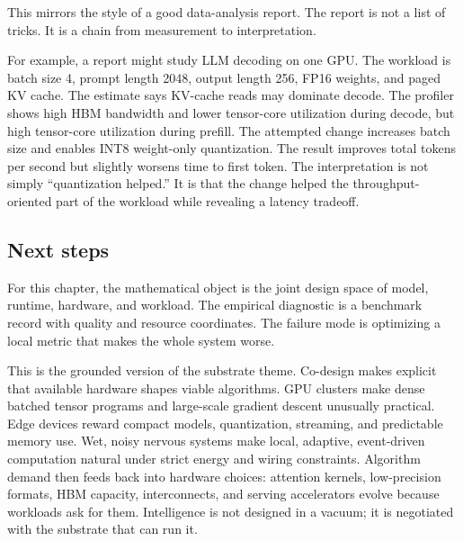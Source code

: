 This mirrors the style of a good data-analysis report. The report is not a list of tricks. It is a chain from measurement to interpretation.

For example, a report might study LLM decoding on one GPU. The workload is batch size 4, prompt length 2048, output length 256, FP16 weights, and paged KV cache. The estimate says KV-cache reads may dominate decode. The profiler shows high HBM bandwidth and lower tensor-core utilization during decode, but high tensor-core utilization during prefill. The attempted change increases batch size and enables INT8 weight-only quantization. The result improves total tokens per second but slightly worsens time to first token. The interpretation is not simply ``quantization helped.'' It is that the change helped the throughput-oriented part of the workload while revealing a latency tradeoff.

\subsection{Next steps}

For this chapter, the mathematical object is the joint design space of model, runtime, hardware, and workload. The empirical diagnostic is a benchmark record with quality and resource coordinates. The failure mode is optimizing a local metric that makes the whole system worse.

This is the grounded version of the substrate theme. Co-design makes explicit that available hardware shapes viable algorithms. GPU clusters make dense batched tensor programs and large-scale gradient descent unusually practical. Edge devices reward compact models, quantization, streaming, and predictable memory use. Wet, noisy nervous systems make local, adaptive, event-driven computation natural under strict energy and wiring constraints. Algorithm demand then feeds back into hardware choices: attention kernels, low-precision formats, HBM capacity, interconnects, and serving accelerators evolve because workloads ask for them. Intelligence is not designed in a vacuum; it is negotiated with the substrate that can run it.


